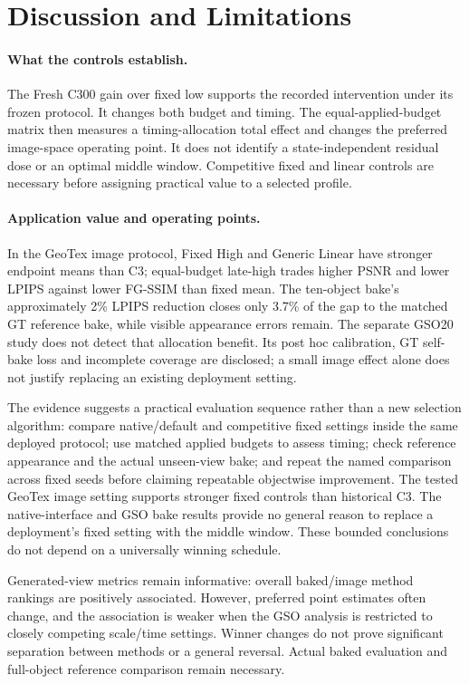 \documentclass[times,twocolumn,final]{elsarticle}
\begin{document}
\FloatBarrier
\section{Discussion and Limitations}
\label{sec:limitations}

\paragraph{What the controls establish.}
The Fresh C300 gain over fixed low supports the recorded intervention under its frozen protocol. It changes both budget and timing. The equal-applied-budget matrix then measures a timing-allocation total effect and changes the preferred image-space operating point. It does not identify a state-independent residual dose or an optimal middle window. Competitive fixed and linear controls are necessary before assigning practical value to a selected profile.

\paragraph{Application value and operating points.}
In the GeoTex image protocol, Fixed High and Generic Linear have stronger endpoint means than C3; equal-budget late-high trades higher PSNR and lower LPIPS against lower FG-SSIM than fixed mean. The ten-object bake's approximately 2\% LPIPS reduction closes only 3.7\% of the gap to the matched GT reference bake, while visible appearance errors remain. The separate GSO20 study does not detect that allocation benefit. Its post hoc calibration, GT self-bake loss and incomplete coverage are disclosed; a small image effect alone does not justify replacing an existing deployment setting.

The evidence suggests a practical evaluation sequence rather than a new selection algorithm: compare native/default and competitive fixed settings inside the same deployed protocol; use matched applied budgets to assess timing; check reference appearance and the actual unseen-view bake; and repeat the named comparison across fixed seeds before claiming repeatable objectwise improvement. The tested GeoTex image setting supports stronger fixed controls than historical C3. The native-interface and GSO bake results provide no general reason to replace a deployment's fixed setting with the middle window. These bounded conclusions do not depend on a universally winning schedule.

Generated-view metrics remain informative: overall baked/image method rankings are positively associated. However, preferred point estimates often change, and the association is weaker when the GSO analysis is restricted to closely competing scale/time settings. Winner changes do not prove significant separation between methods or a general reversal. Actual baked evaluation and full-object reference comparison remain necessary.
\end{document}
